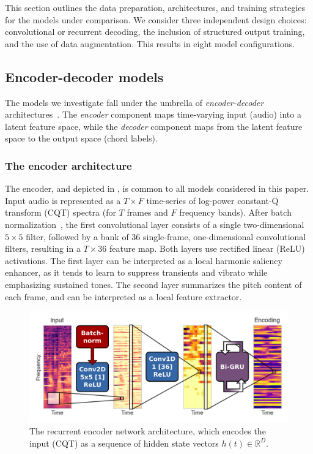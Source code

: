 \documentclass{article}
\begin{document}

This section outlines the data preparation, architectures, and training strategies for the models under comparison.
We consider three independent design choices: convolutional or recurrent decoding, the inclusion of structured output training, and the use of data augmentation.
This results in eight model configurations.

\subsection{Encoder-decoder models}

The models we investigate fall under the umbrella of \emph{encoder-decoder} architectures~\cite{cho2015describing}.
The \emph{encoder} component maps time-varying input (audio) into a latent feature space, while the \emph{decoder} component maps from the latent feature space to the output space (chord labels).

\subsubsection{The encoder architecture}
The encoder, and depicted in , is common to all models considered in this paper.
Input audio is represented as a $T\times F$ time-series of log-power constant-Q transform (CQT) spectra (for $T$ frames and $F$ frequency bands).
After batch normalization~\cite{ioffe2015batch}, the first convolutional layer consists of a single two-dimensional $5\times5$ filter, followed by a bank of $36$ single-frame, one-dimensional convolutional filters, resulting in a $T\times 36$ feature map.
Both layers use rectified linear (ReLU) activations.
The first layer can be interpreted as a local harmonic saliency enhancer, as it tends to learn to suppress transients and vibrato while emphasizing sustained tones.
The second layer summarizes the pitch content of each frame, and can be interpreted as a local feature extractor.

\begin{figure}[t]
    \centering
    \includegraphics[width=\columnwidth]{encoder-r}
    \caption{The recurrent encoder network architecture, which encodes the input (CQT) as a sequence of hidden state vectors $h(t) \in \mathbb{R}^D$.\label{fig:encoder}}
\end{figure}
\end{document}
